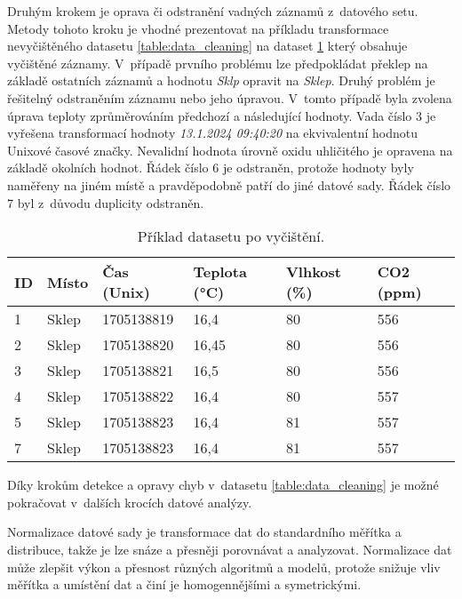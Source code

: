 Druhým krokem je oprava či odstranění vadných záznamů z~datového setu. Metody tohoto kroku je vhodné prezentovat na příkladu transformace nevyčištěného datasetu \ref{table:data_cleaning} na dataset \ref{table:after_data_cleaning} který obsahuje vyčištěné záznamy. V~případě prvního problému lze předpokládat překlep na základě ostatních záznamů a hodnotu \textit{Sklp} opravit na \textit{Sklep}. Druhý problém je řešitelný odstraněním záznamu nebo jeho úpravou. V~tomto případě byla zvolena úprava teploty zprůměrováním předchozí a následující hodnoty. Vada číslo 3 je vyřešena transformací hodnoty \textit{13.1.2024 09:40:20} na ekvivalentní hodnotu Unixové časové značky. Nevalidní hodnota úrovně oxidu uhličitého je opravena na základě okolních hodnot. Řádek číslo 6 je odstraněn, protože hodnoty byly naměřeny na jiném místě a pravděpodobně patří do jiné datové sady. Řádek číslo 7 byl z~důvodu duplicity odstraněn. 

\begin{table}[ht]
\begin{center}
\begin{tabular}{|l|l|l|l|l|l|}
\hline
ID & Místo & Čas (Unix) & Teplota (°C) & Vlhkost (\%) & CO2 (ppm) \\ \hline
1  & Sklep & 1705138819 & 16,4         & 80          & 556       \\ \hline
2  & Sklep & 1705138820 & 16,45        & 80          & 556       \\ \hline
3  & Sklep & 1705138821 & 16,5         & 80          & 556       \\ \hline
4  & Sklep & 1705138822 & 16,4         & 80          & 557       \\ \hline
5  & Sklep & 1705138823 & 16,4         & 81          & 557       \\ \hline
7  & Sklep & 1705138823 & 16,4         & 81          & 557       \\ \hline
\end{tabular} \caption{Příklad datasetu po vyčištění.} \label{table:after_data_cleaning}
\end{center} 
\end{table}

Díky krokům detekce a opravy chyb v~datasetu \ref{table:data_cleaning} je možné pokračovat v~dalších krocích datové analýzy.

Normalizace datové sady je transformace dat do standardního měřítka a distribuce, takže je lze snáze a přesněji porovnávat a analyzovat. Normalizace dat může zlepšit výkon a přesnost různých algoritmů a modelů, protože snižuje vliv měřítka a umístění dat a činí je homogennějšími a symetrickými. \cite{rahm2000data}

